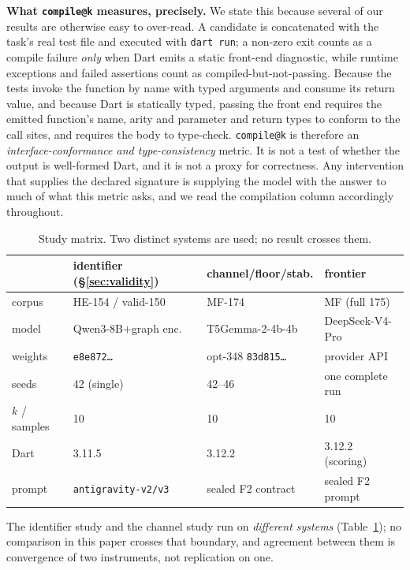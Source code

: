 \documentclass[conference]{IEEEtran}
\makeatletter
\newcommand{\compileatk}{\texttt{compile@k}\xspace}
\makeatother
\begin{document}
\textbf{What \compileatk measures, precisely.} We state this because several of
our results are otherwise easy to over-read. A candidate is concatenated with the
task's real test file and executed with \texttt{dart run}; a non-zero exit counts
as a compile failure \emph{only} when Dart emits a static front-end diagnostic,
while runtime exceptions and failed assertions count as compiled-but-not-passing.
Because the tests invoke the function by name with typed arguments and consume
its return value, and because Dart is statically typed, passing the front end
requires the emitted function's name, arity and parameter and return types to
conform to the call sites, and requires the body to type-check. \compileatk is
therefore an \emph{interface-conformance and type-consistency} metric. It is not
a test of whether the output is well-formed Dart, and it is not a proxy for
correctness. Any intervention that supplies the declared signature is supplying
the model with the answer to much of what this metric asks, and we read the
compilation column accordingly throughout.

\begin{table}[t]
\caption{Study matrix. Two distinct systems are used; no result crosses them.}
\label{tab:studies}
\centering\scriptsize
\setlength{\tabcolsep}{3pt}
\begin{tabular}{@{}llll@{}}
\toprule
 & \textbf{identifier (\S\ref{sec:validity})} & \textbf{channel/floor/stab.} & \textbf{frontier}\\
\midrule
corpus   & HE-154 / valid-150 & MF-174 & MF (full 175)\\
model    & Qwen3-8B$+$graph enc. & T5Gemma-2-4b-4b & DeepSeek-V4-Pro\\
weights  & \texttt{e8e872\ldots} & opt-348 \texttt{83d815\ldots} & provider API\\
seeds    & 42 (single) & 42--46 & one complete run\\
$k$ / samples & 10 & 10 & 10\\
Dart     & 3.11.5 & 3.12.2 & 3.12.2 (scoring)\\
prompt   & \texttt{antigravity-v2/v3} & sealed F2 contract & sealed F2 prompt\\
\bottomrule
\end{tabular}
\end{table}

The identifier study and the channel study run on \emph{different systems}
(Table~\ref{tab:studies}); no comparison in this paper crosses that boundary, and
agreement between them is convergence of two instruments, not replication on
one.
\end{document}
